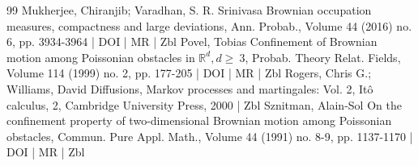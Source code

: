 \begin{thebibliography}{99}
Mukherjee, Chiranjib; Varadhan, S. R. Srinivasa Brownian occupation measures, compactness and large deviations, Ann. Probab., Volume 44 (2016) no. 6, pp. 3934-3964 | DOI | MR | Zbl
Povel, Tobias Confinement of Brownian motion among Poissonian obstacles in $\mathbb{R}^d, d\ge ~3$, Probab. Theory Relat. Fields, Volume 114 (1999) no. 2, pp. 177-205 | DOI | MR | Zbl
Rogers, Chris G.; Williams, David Diffusions, Markov processes and martingales: Vol. 2, Itô calculus, 2, Cambridge University Press, 2000 | Zbl
Sznitman, Alain-Sol On the confinement property of two-dimensional Brownian motion among Poissonian obstacles, Commun. Pure Appl. Math., Volume 44 (1991) no. 8-9, pp. 1137-1170 | DOI | MR | Zbl
\end{thebibliography}

